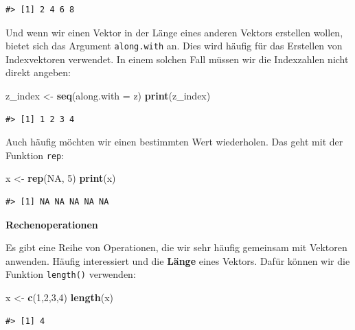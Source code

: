 \documentclass[]{book}
\newenvironment{Shaded}{\begin{snugshade}}{\end{snugshade}}
\newcommand{\KeywordTok}[1]{\textcolor[rgb]{0.13,0.29,0.53}{\textbf{#1}}}
\newcommand{\DataTypeTok}[1]{\textcolor[rgb]{0.13,0.29,0.53}{#1}}
\newcommand{\DecValTok}[1]{\textcolor[rgb]{0.00,0.00,0.81}{#1}}
\newcommand{\StringTok}[1]{\textcolor[rgb]{0.31,0.60,0.02}{#1}}
\newcommand{\OtherTok}[1]{\textcolor[rgb]{0.56,0.35,0.01}{#1}}
\newcommand{\NormalTok}[1]{#1}
\begin{document}
\begin{verbatim}
#> [1] 2 4 6 8
\end{verbatim}

Und wenn wir einen Vektor in der Länge eines anderen Vektors erstellen
wollen, bietet sich das Argument \texttt{along.with} an. Dies wird
häufig für das Erstellen von Indexvektoren verwendet. In einem solchen
Fall müssen wir die Indexzahlen nicht direkt angeben:

\begin{Shaded}
\begin{Highlighting}[]
\NormalTok{z_index <-}\StringTok{ }\KeywordTok{seq}\NormalTok{(}\DataTypeTok{along.with =}\NormalTok{ z)}
\KeywordTok{print}\NormalTok{(z_index)}
\end{Highlighting}
\end{Shaded}

\begin{verbatim}
#> [1] 1 2 3 4
\end{verbatim}

Auch häufig möchten wir einen bestimmten Wert wiederholen. Das geht mit
der Funktion \texttt{rep}:

\begin{Shaded}
\begin{Highlighting}[]
\NormalTok{x <-}\StringTok{ }\KeywordTok{rep}\NormalTok{(}\OtherTok{NA}\NormalTok{, }\DecValTok{5}\NormalTok{)}
\KeywordTok{print}\NormalTok{(x)}
\end{Highlighting}
\end{Shaded}

\begin{verbatim}
#> [1] NA NA NA NA NA
\end{verbatim}

\textbf{Rechenoperationen}

Es gibt eine Reihe von Operationen, die wir sehr häufig gemeinsam mit
Vektoren anwenden. Häufig interessiert und die \textbf{Länge} eines
Vektors. Dafür können wir die Funktion \texttt{length()} verwenden:

\begin{Shaded}
\begin{Highlighting}[]
\NormalTok{x <-}\StringTok{ }\KeywordTok{c}\NormalTok{(}\DecValTok{1}\NormalTok{,}\DecValTok{2}\NormalTok{,}\DecValTok{3}\NormalTok{,}\DecValTok{4}\NormalTok{)}
\KeywordTok{length}\NormalTok{(x)}
\end{Highlighting}
\end{Shaded}

\begin{verbatim}
#> [1] 4
\end{verbatim}
\end{document}
